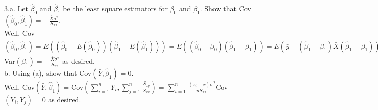 \documentclass[12pt]{article}
\begin{document}
3.a. Let $\hat{\beta}_0$ and $\hat{\beta}_1$ be the least square estimators for $\beta_0$ and $\beta_1$. Show that Cov$(\hat{\beta}_0,\hat{\beta}_1)=-\frac{\bar{X}\sigma^2}{S_{xx}}$.\\
Well, Cov$(\hat{\beta}_0, \hat{\beta}_1)=E((\hat{\beta}_0-E(\hat{\beta}_0))(\hat{\beta}_1-E(\hat{\beta}_1)))=E((\hat{\beta}_0-\beta_0)(\hat{\beta}_1-\beta_1))=E(\bar{y}-(\hat{\beta}_1-\beta_1)\bar{X}(\hat{\beta}_1-\beta_1))=E(\bar{Y}(\hat{\beta}_1-\beta_1)-\bar{X}(\hat{\beta}_1-\beta_1)^2)=0-\bar{X}E(\hat{\beta}_1-\beta_1)^2=-\bar{X}$Var$(\beta_1)=-\frac{\bar{X}\sigma^2}{S_{xx}}$ as desired.\\
b. Using (a), show that Cov$(\bar{Y},\hat{\beta}_1)=0$.\\
Well, Cov$(\bar{Y},\hat{\beta}_1)=$Cov$(\sum_{i=1}^nY_i,\sum_{j=1}^n\frac{S_{xy}}{S_{xx}})=\sum_{i=1}^n\frac{(x_i-\bar{x})\sigma^2}{nS_{xx}}$Cov$(Y_i,Y_j)=0$ as desired.%
\end{document}
